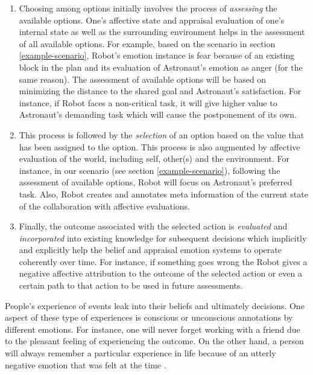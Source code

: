 \documentclass[11pt]{article}
\begin{document}
\begin{enumerate}
  \item Choosing among options initially involves the process of
  \emph{assessing} the available options. One's affective state and appraisal
  evaluation of one's internal state as well as the surrounding environment
  helps in the assessment of all available options. For example, based on the
  scenario in section \ref{example-scenario}, Robot's emotion instance is fear
  because of an existing block in the plan and its evaluation of Astronaut's
  emotion as anger (for the same reason). The assessment of available options
  will be based on minimizing the distance to the shared goal and Astronaut's
  satisfaction. For instance, if Robot faces a non-critical task, it will give
  higher value to Astronaut's demanding task which will cause the postponement
  of its own.
  
  \item This process is followed by the \emph{selection} of an option based on
  the value that has been assigned to the option. This process is also augmented
  by affective evaluation of the world, including self, other(s) and the
  environment. For instance, in our scenario (see section
  \ref{example-scenario}), following the assessment of available options, Robot
  will focus on Astronaut's preferred task. Also, Robot creates and annotates
  meta information of the current state of the collaboration with affective
  evaluations.
  
  \item Finally, the outcome associated with the selected action is
  \emph{evaluated} and \emph{incorporated} into existing knowledge for
  subsequent decisions which implicitly and explicitly help the belief and
  appraisal emotion systems to operate coherently over time. For instance, if
  something goes wrong the Robot gives a negative affective attribution to the
  outcome of the selected action or even a certain path to that action to be
  used in future assessments.
\end{enumerate}

People's experience of events leak into their beliefs and ultimately decisions.
One aspect of these type of experiences is conscious or unconscious annotations
by different emotions. For instance, one will never forget working with a friend
due to the pleasant feeling of experiencing the outcome. On the other hand, a
person will always remember a particular experience in life because of an
utterly negative emotion that was felt at the time
\cite{paulus:emotion-decision-belief}.
\end{document}

